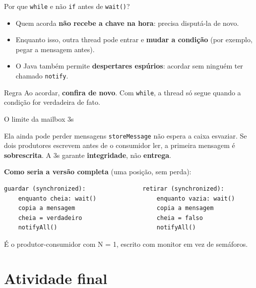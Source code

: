 \documentclass[aspectratio=169]{beamer}
\begin{document}
\begin{frame}{Por que \texttt{while} e não \texttt{if} antes de \texttt{wait()}?}
\begin{itemize}
    \item Quem acorda \textbf{não recebe a chave na hora}: precisa disputá-la de novo.
    \item Enquanto isso, outra thread pode entrar e \textbf{mudar a condição} (por exemplo, pegar a mensagem antes).
    \item O Java também permite \textbf{despertares espúrios}: acordar sem ninguém ter chamado \texttt{notify}.
\end{itemize}

\vspace{0.6em}
\begin{exampleblock}{Regra}
Ao acordar, \textbf{confira de novo}. Com \texttt{while}, a thread só segue quando a condição for verdadeira de fato.
\end{exampleblock}
\end{frame}

\begin{frame}[fragile]{O limite da mailbox 3s}
\begin{alertblock}{Ela ainda pode perder mensagens}
\texttt{storeMessage} não espera a caixa esvaziar. Se dois produtores escrevem antes de o consumidor ler, a primeira mensagem é \textbf{sobrescrita}. A 3s garante \textbf{integridade}, não \textbf{entrega}.
\end{alertblock}

\textbf{Como seria a versão completa} (uma posição, sem perda):
\begin{lstlisting}[style=terminal, basicstyle=\ttfamily\scriptsize\color{termfg}]
guardar (synchronized):                retirar (synchronized):
    enquanto cheia: wait()                 enquanto vazia: wait()
    copia a mensagem                       copia a mensagem
    cheia = verdadeiro                     cheia = falso
    notifyAll()                            notifyAll()
\end{lstlisting}

\small É o produtor-consumidor com N = 1, escrito com monitor em vez de semáforos.
\end{frame}

\section{Atividade final}
\end{document}
